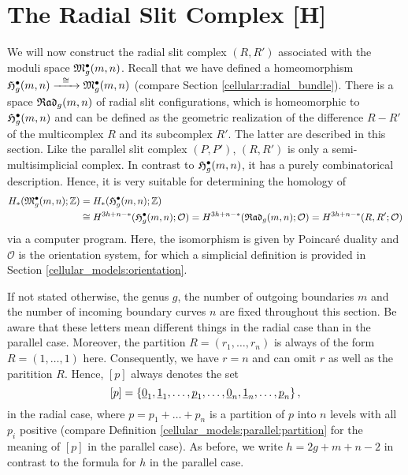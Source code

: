 \section{The Radial Slit Complex [H]}
\label{cellular_models:radial}

We will now construct the radial slit complex $(R,R')$ associated with the moduli space $\mathfrak{M}^\bullet_g(m, n)$.
Recall that we have defined a homeomorphism $\mathfrak{H}^{\bullet}_g(m, n) \xrightarrow{\hspace{6pt}{\cong}\hspace{6pt}} \mathfrak{M}^\bullet_g(m, n)$ (compare Section \ref{cellular:radial_bundle}).
There is a space ${\mathfrak{Rad}_g(m,n)}$ of radial slit configurations, which is homeomorphic to $\mathfrak{H}^{\bullet}_g(m, n)$
and can be defined as the geometric realization of the difference $R - R'$ of the multicomplex $R$ and its subcomplex $R'$.
The latter are described in this section.
Like the parallel slit complex $(P, P')$, $(R, R')$ is only a semi-multisimplicial complex.
In contrast to $\mathfrak{H}^{\bullet}_g(m, n)$, it has a purely combinatorical description.
Hence, it is very suitable for determining the homology of
\begin{align*}
   H_\ast( \mathfrak{M}^\bullet_g(m, n); \mathbb Z ) &= H_\ast( \mathfrak{H}^{\bullet}_g(m, n); \mathbb Z ) \\
                            &\cong H^{3h+n-\ast}( \mathfrak{H}^{\bullet}_g(m, n); \mathcal O ) = H^{3h+n-\ast}( {\mathfrak{Rad}_g(m,n)}; \mathcal O ) = H^{3h+n-\ast}( R, R'; \mathcal O)
\end{align*}
via a computer program.
Here, the isomorphism is given by Poincaré duality and $\mathcal O$ is the orientation system, 
for which a simplicial definition is provided in Section \ref{cellular_models:orientation}.

If not stated otherwise, the genus $g$, the number of outgoing boundaries $m$ and the number of incoming boundary curves $n$ are fixed throughout this section.
Be aware that these letters mean different things in the radial case than in the parallel case.
Moreover, the partition $R = (r_1, \dotsc, r_n)$ is always of the form $R = (1, \dotsc, 1)$ here.
Consequently, we have $r = n$ and can omit $r$ as well as the paritition $R$.
Hence, $[p]$ always denotes the set
\[
    [p] = \{ \ul 0_1, \ul 1_1, \ldots, \ul p_1, \ldots, \ul 0_n, \ul 1_n, \ldots, \ul p_n \}\,,
\]
in the radial case, where $p = p_1+\ldots+p_n$ is a partition of $p$ into $n$ levels with all $p_i$ positive (compare Definition \ref{cellular_models:parallel:partition} for the meaning of $[p]$ in the parallel case). 
As before, we write $h = 2g+m+n-2$ in contrast to the formula for $h$ in the parallel case.

